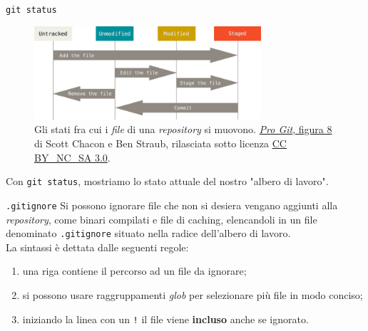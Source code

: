 \documentclass{beamer}
\begin{document}
\begin{frame}{\texttt{git status}}
  \begin{figure}
    \includegraphics[width=0.75\textwidth]{assets/lifecycle.png}
    \caption{Gli stati fra cui i \emph{file} di una \emph{repository} si
    muovono. \href{https://git-scm.com/book/en/v2/Git-Basics-Recording-Changes-to-the-Repository}{\emph{Pro Git},
    figura 8} di Scott Chacon e Ben Straub, rilasciata sotto licenza
    \href{https://creativecommons.org/licenses/by-nc-sa/3.0/}{CC
    BY\_NC\_SA 3.0}.}
  \end{figure}\pause
  Con \texttt{git status}, mostriamo lo stato attuale del nostro "albero di
  lavoro".
\end{frame}

\begin{frame}{\texttt{.gitignore}}
  Si possono ignorare file che non si desiera vengano aggiunti alla
  \emph{repository}, come binari compilati e file di caching, elencandoli in un
  file denominato \texttt{.gitignore} situato nella radice dell'albero di
  lavoro. \\
  La sintassi \`e dettata dalle seguenti regole:
  \begin{enumerate}
    \item una riga contiene il percorso ad un file da ignorare;
    \item si possono usare raggruppamenti \emph{glob} per selezionare pi\`u file
      in modo conciso;
    \item iniziando la linea con un \texttt{!} il file viene \textbf{incluso}
      anche se ignorato.
  \end{enumerate}
\end{frame}
\end{document}
